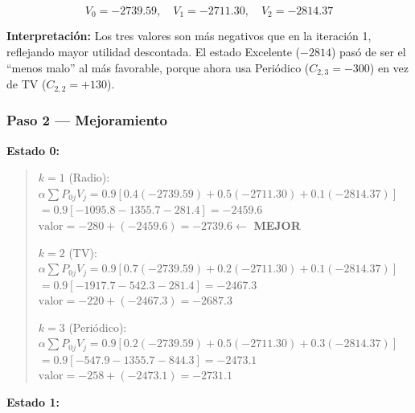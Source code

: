 \documentclass[12pt,a4paper]{article}
\begin{document}
\[
\boxed{ \boxed{ V_0 = -2739.59,\quad V_1 = -2711.30,\quad V_2 = -2814.37 } }
\]

\textbf{Interpretación:} Los tres valores son más negativos que en la iteración 1, reflejando mayor utilidad descontada. El estado Excelente ($-2814$) pasó de ser el ``menos malo'' al más favorable, porque ahora usa Periódico ($C_{2,3}=-300$) en vez de TV ($C_{2,2}=+130$).

\subsubsection*{Paso 2 --- Mejoramiento}

\textbf{Estado 0:}

\begin{quote}\footnotesize
$k=1$ (Radio):\;
$\alpha\sum P_{0j}V_j = 0.9[0.4(-2739.59) + 0.5(-2711.30) + 0.1(-2814.37)]$ \\
\hspace*{1.8cm} $= 0.9[-1095.8 - 1355.7 - 281.4] = -2459.6$ \\
\hspace*{1.8cm} $\text{valor} = -280 + (-2459.6) = \mathbf{-2739.6}$\quad $\leftarrow$ \textbf{MEJOR}

\vspace{3pt}
$k=2$ (TV):\;
$\alpha\sum P_{0j}V_j = 0.9[0.7(-2739.59) + 0.2(-2711.30) + 0.1(-2814.37)]$ \\
\hspace*{1.8cm} $= 0.9[-1917.7 - 542.3 - 281.4] = -2467.3$ \\
\hspace*{1.8cm} $\text{valor} = -220 + (-2467.3) = -2687.3$

\vspace{3pt}
$k=3$ (Periódico):\;
$\alpha\sum P_{0j}V_j = 0.9[0.2(-2739.59) + 0.5(-2711.30) + 0.3(-2814.37)]$ \\
\hspace*{1.8cm} $= 0.9[-547.9 - 1355.7 - 844.3] = -2473.1$ \\
\hspace*{1.8cm} $\text{valor} = -258 + (-2473.1) = -2731.1$
\end{quote}

\vspace{0.3cm}
\textbf{Estado 1:}
\end{document}
